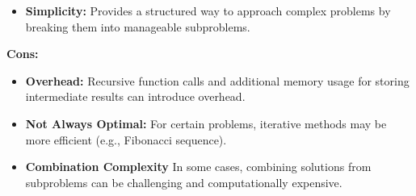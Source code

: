 \documentclass[journal]{IEEEtran}
\begin{document}
\begin{enumerate}
\begin{itemize}
\item \textbf{Simplicity:} Provides a structured way to approach complex problems by breaking them into manageable subproblems.
\end{itemize} 
\textbf{Cons:} 
\begin{itemize}
\item \textbf{Overhead:} Recursive function calls and additional memory usage for storing intermediate results can introduce overhead.
\item \textbf{Not Always Optimal:} For certain problems, iterative methods may be more efficient (e.g., Fibonacci sequence).
\item \textbf{Combination Complexity} In some cases, combining solutions from subproblems can be challenging and computationally expensive.
\end{itemize}

\end{enumerate}
\end{document}
